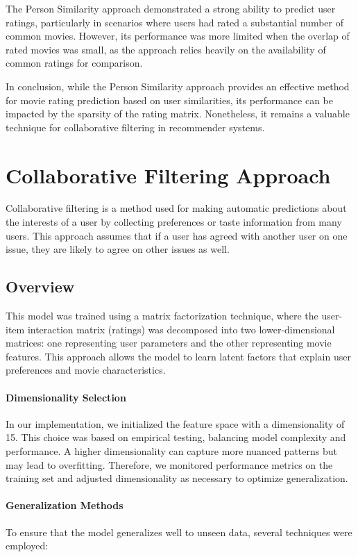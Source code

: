 \documentclass[a4paper,9pt]{article}
\begin{document}
The Person Similarity approach demonstrated a strong ability to predict user ratings,
particularly in scenarios where users had rated a substantial number of common movies.
However, its performance was more limited when the overlap of rated movies was small, as the approach relies heavily
on the availability of common ratings for comparison.

In conclusion, while the Person Similarity approach provides an effective method for movie rating prediction based on user
similarities, its performance can be impacted by the sparsity of the rating matrix.
Nonetheless, it remains a valuable technique for collaborative filtering in recommender systems.

\clearpage
\section{Collaborative Filtering Approach}
Collaborative filtering is a method used for making automatic predictions about the interests of a user by collecting preferences or taste information from many users. This approach assumes that if a user has agreed with another user on one issue, they are likely to agree on other issues as well.

\subsection{Overview}
This model was trained using a matrix factorization technique, where the user-item interaction matrix (ratings) was decomposed into two lower-dimensional matrices: one representing user parameters and the other representing movie features. This approach allows the model to learn latent factors that explain user preferences and movie characteristics.

\paragraph{Dimensionality Selection}
In our implementation, we initialized the feature space with a dimensionality of 15. This choice was based on empirical testing, balancing model complexity and performance. A higher dimensionality can capture more nuanced patterns but may lead to overfitting. Therefore, we monitored performance metrics on the training set and adjusted dimensionality as necessary to optimize generalization.

\paragraph{Generalization Methods}
To ensure that the model generalizes well to unseen data, several techniques were employed:
\end{document}
